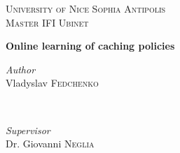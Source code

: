 \begin{titlepage}
	\center %
	
	\vfill
	
	
	\textsc{\LARGE University of Nice Sophia Antipolis}\\[1.5cm] %
	
	\textsc{\Large Master IFI Ubinet}\\[0.5cm] %
	
	
	
	
	\vfill
	
	{\huge\bfseries Online learning of caching policies}\\[0.4cm] %

	\vfill
	
	
	
	\begin{minipage}{0.35\textwidth}
		\begin{flushleft}
			\large
			\textit{Author}\\
			Vladyslav \textsc{Fedchenko} %
		\end{flushleft}
	\end{minipage}
	~
	\begin{minipage}{0.35\textwidth}
		\begin{flushright}
			\large
			\textit{Supervisor}\\
			Dr. Giovanni \textsc{Neglia} %
		\end{flushright}
	\end{minipage}
	
	

\end{titlepage}
